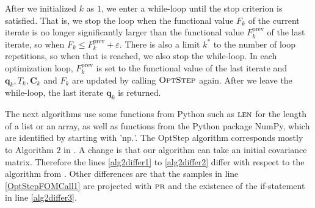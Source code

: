 After we initialized $k$ as $1$, we enter a while-loop until the stop criterion is satisfied. That is, we stop the loop when the functional value $F_k$ of the current iterate is no longer significantly larger than the functional value $F^\mathrm{prev}_k$ of the last iterate, so when $F_k\leq F^\mathrm{prev}_k+\varepsilon$. There is also a limit $k^*$ to the number of loop repetitions, so when that is reached, we also stop the while-loop. In each optimization loop, $F^\mathrm{prev}_{k}$ is set to the functional value of the last iterate and $\mathbf{q}_k,T_k,\mathbf{C}_k$ and $F_k$ are updated by calling $\textproc{OptStep}$ again. After we leave the while-loop, the last iterate $\mathbf{q}_k$ is returned.

The next algorithms use some functions from Python such as $\textproc{len}$ for the length of a list or an array, as well as functions from the Python package NumPy, which are identified by starting with '$\mathrm{np.}$'. The OptStep algorithm corresponds mostly to Algorithm $2$ in \cite{Keil2022-dj}. A change is that our algorithm can take an initial covariance matrix. Therefore the lines \ref{alg2differ1} to \ref{alg2differ2} differ with respect to the algorithm from \cite{Keil2022-dj}. Other differences are that the samples in line \ref{OptStepFOMCall1} are projected with $\textproc{pr}$ and the existence of the if-statement in line \ref{alg2differ3}.


